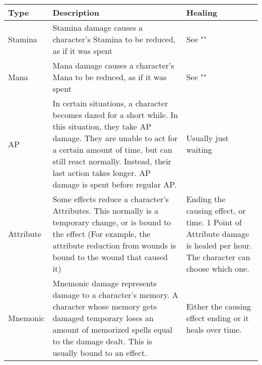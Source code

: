 \begin{longtable}{l p{5cm} p{5cm}}
Type & Description & Healing \\ \hline
Stamina & Stamina damage causes a character's Stamina to be reduced, as if it was spent & See "\nameref{subsec:recoverStamina}" \\
Mana & Mana damage causes a character's Mana to be reduced, as if it was spent & See "\nameref{subsec:recoverStamina}" \\
AP & In certain situations, a character becomes dazed for a short while. In this situation, they take AP damage. They are unable to act for a certain amount of time, but can still react normally. Instead, their last action takes longer. AP damage is spent before regular AP. & Usually just waiting\\
Attribute & Some effects reduce a character's Attributes. This normally is a temporary change, or is bound to the effect (For example, the attribute reduction from wounds is bound to the wound that caused it) & Ending the causing effect, or time. 1 Point of Attribute damage is healed per hour. The character can choose which one.\\
Mnemonic & Mnemonic damage represents damage to a character's memory. A character whose memory gets damaged temporary loses an amount of memorized spells equal to the damage dealt. This is usually bound to an effect. & Either the causing effect ending or it heals over time.\\
\end{longtable}
